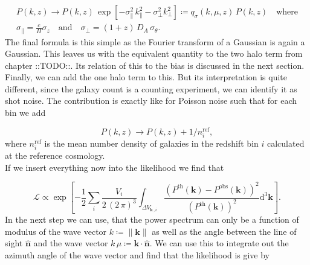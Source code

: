\documentclass[oneside]{book}
\newcommand*{\rd}{\mathrm{d}}
\newcommand*{\marktodo}{{\color{mmcol} ::TODO::}\xspace}
\begin{document}
\begin{align}
    P(k,z) \to P(k,z)\,\exp\left[- \sigma_\|^2 \, k_\|^2 - \sigma_\perp^2 k_\perp^2 \right]\coloneq q_\sigma(k,\mu,z)\,P(k,z)\quad \text{where} \\
    \sigma_\| = \frac{c}{H} \sigma_z \quad \text{and} \quad \sigma_\perp = (1+z)\,D_A \, \sigma_\theta. \nonumber
\end{align}
The final formula is this simple as the Fourier transform of a Gaussian is again a Gaussian. This leaves us with the equivalent quantity to the two halo term from chapter \marktodo. Its relation of this to the bias is discussed in the next section.
Finally, we can add the one halo term to this. But its interpretation is quite different, since the galaxy count is a counting experiment, we can identify it as shot noise. The contribution is exactly like for Poisson noise such that for each bin we add 

\begin{equation}
    P(k,z) \to P(k,z) + 1/n_i^\mathrm{ref},
\end{equation}  
where $n_i^\mathrm{ref}$ is the mean number density of galaxies in the redshift bin $i$ calculated at the reference cosmology.\\
 If we insert everything now into the likelihood we find that 
 
 \begin{equation}
    \mathcal{L} \propto \exp\left[-\frac{1}{2} \sum_i \frac{V_i}{2\,(2\,\pi)^3} \int_{\Delta V_{\boldsymbol{k}\,,i}} \frac{\left(P^\mathrm{th}(\boldsymbol{k})-P^\mathrm{obs}(\boldsymbol{k})\right)^2}{\left(P^\mathrm{th}(\boldsymbol{k})\right)^2} \rd^3 \boldsymbol{k} \right].
 \end{equation}
 In the next step we can use, that the power spectrum can only be a function of modulus of the wave vector $k \coloneq \|\boldsymbol{k}\|$ as well as the angle between the line of sight $\hat{\boldsymbol{n}}$ and the wave vector $k \,\mu \coloneq \boldsymbol{k} \cdot \hat{\boldsymbol{n}}$. We can use this to integrate out the azimuth angle of the wave vector and find that the likelihood is give by
 
\end{document}
